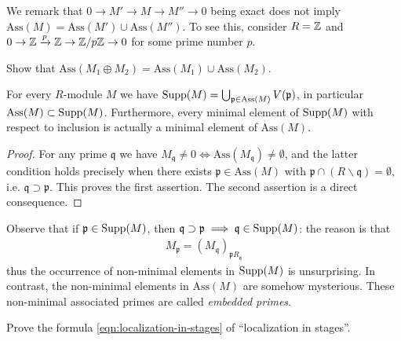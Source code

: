 We remark that $0 \to M' \to M \to M'' \to 0$ being exact does not imply $\text{Ass}(M) = \text{Ass}(M') \cup \text{Ass}(M'')$. To see this, consider $R=\mathbb{Z}$ and $0 \to \mathbb{Z} \xrightarrow{p} \mathbb{Z} \to \mathbb{Z}/p\mathbb{Z} \to 0$ for some prime number $p$.

\begin{exercise}
	Show that $\text{Ass}(M_1 \oplus M_2) = \text{Ass}(M_1) \cup \text{Ass}(M_2)$.
\end{exercise}

\begin{theorem}\label{prop:Supp-Ass}
	For every $R$-module $M$ we have $\operatorname{Supp}(M) = \bigcup_{\mathfrak{p} \in \text{Ass}(M)} V(\mathfrak{p})$, in particular $\text{Ass}(M) \subset \operatorname{Supp}(M)$.	Furthermore, every minimal element of $\operatorname{Supp}(M)$ with respect to inclusion is actually a minimal element of $\text{Ass}(M)$.
\end{theorem}
\begin{proof}
	For any prime $\mathfrak{q}$ we have $M_{\mathfrak{q}} \neq 0 \iff \text{Ass}(M_{\mathfrak{q}}) \neq \emptyset$, and the latter condition holds precisely when there exists $\mathfrak{p} \in \text{Ass}(M)$ with $\mathfrak{p} \cap (R \smallsetminus \mathfrak{q}) = \emptyset$, i.e. $\mathfrak{q} \supset \mathfrak{p}$. This proves the first assertion. The second assertion is a direct consequence.
\end{proof}

Observe that if $\mathfrak{p} \in \operatorname{Supp}(M)$, then $\mathfrak{q} \supset \mathfrak{p} \implies \mathfrak{q} \in \operatorname{Supp}(M)$: the reason is that
\begin{gather}\label{eqn:localization-in-stages}
	M_{\mathfrak{p}} = (M_{\mathfrak{q}})_{\mathfrak{p}R_{\mathfrak{q}}}
\end{gather}
thus the occurrence of non-minimal elements in $\operatorname{Supp}(M)$ is unsurprising. In contrast, the non-minimal elements in $\text{Ass}(M)$ are somehow mysterious. These non-minimal associated primes are called \emph{embedded primes}. 

\begin{exercise}
	Prove the formula \eqref{eqn:localization-in-stages} of ``localization in stages''.
\end{exercise}

